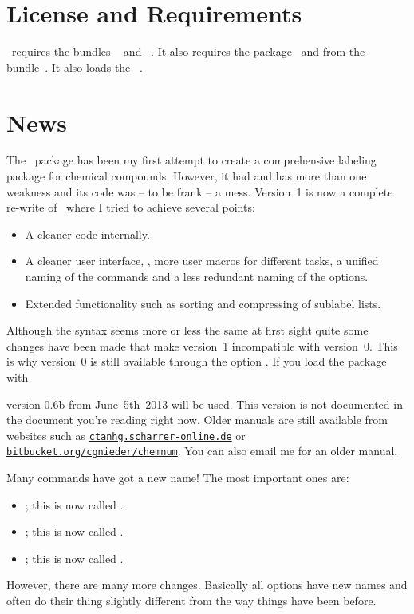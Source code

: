 \documentclass[load-preamble+,babel-options={ngerman,british,american}]{cnltx-doc}
\newcommand*\website[1]{\texttt{\href{http://#1/}{#1}}}
\newcommand*\securewebsite[1]{\texttt{\href{https://#1/}{#1}}}
\begin{document}
\section{License and Requirements}\label{sec:license-requirements}
\license

\chemnum\ requires the bundles ~\cite{bnd:l3kernel} and
~\cite{bnd:l3packages}.  It also requires the
 package~\cite{pkg:translations} and  from
the  bundle~\cite{bnd:chemmacros}.  It also loads the
~\cite{pkg:psfrag}.

\section{News}\label{sec:news}
The \chemnum\ package has been my first attempt to create a comprehensive
labeling package for chemical compounds.  However, it had and has more than
one weakness and its code was -- to be frank -- a mess.  Version~1 is now a
complete re-write of \chemnum\ where I tried to achieve several points:
\begin{itemize}
  \item A cleaner code internally.
  \item A cleaner user interface, \ie, more user macros for different tasks, a
    unified naming of the commands and a less redundant naming of the
    options.
  \item Extended functionality such as sorting and compressing of sublabel
    lists.
\end{itemize}

Although the syntax seems more or less the same at first sight quite some
changes have been made that make version~1 incompatible with version~0.  This
is why version~0 is still available through the option .  If
you load the package with
\begin{sourcecode}
  \usepackage[version=0]{chemnum}
\end{sourcecode}
version 0.6b from June~5th~2013 will be used.  This version is not documented
in the document you're reading right now.  Older manuals are still available
from websites such as \website{ctanhg.scharrer-online.de} or
\securewebsite{bitbucket.org/cgnieder/chemnum}.  You can also email me for an
older manual.

Many commands have got a new name! The most important ones are:
\begin{itemize}
  \item {}; this is now called .
  \item {}; this is now called .
  \item {}; this is now called .
\end{itemize}
However, there are many more changes.  Basically all options have new names
and often do their thing slightly different from the way things have been
before.
\end{document}
